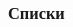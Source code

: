 \documentclass{beamer}
\begin{document}
\begin{frame}
  \frametitle{Списки}
  \begin{columns}
    \begin{column}{0.5\textwidth}
      \begin{figure}[h!]
      \end{figure}
    \end{column}
    \begin{column}{0.5\textwidth}
      \begin{figure}[h!]
      \end{figure}
    \end{column}
  \end{columns}  
\end{frame}
\end{document}
